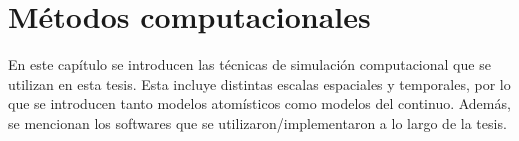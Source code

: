 \chapter{Métodos computacionales}\label{ch:metodos}
\thispagestyle{empty}

\vspace{50pt}

\begin{adjustwidth}{50pt}{50pt}
    En este capítulo se introducen las técnicas de simulación computacional que se utilizan
    en esta tesis. Esta incluye distintas escalas espaciales y temporales, por 
    lo que se introducen tanto modelos atomísticos como modelos del continuo.
    Además, se mencionan los softwares que se utilizaron/implementaron a lo largo
    de la tesis.
\end{adjustwidth}

\clearpage
\newpage
\thispagestyle{empty}
\mbox{}
\newpage

% 

% 



% 
